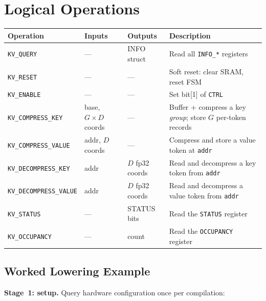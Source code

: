 \documentclass[11pt]{article}
\begin{document}
\section{Logical Operations}
\label{sec:ops}

\begin{table}[h]
\centering
\small
\begin{tabular}{@{}l l l p{5.5cm}@{}}
\toprule
Operation                     & Inputs             & Outputs          & Description \\
\midrule
\texttt{KV\_QUERY}            & ---                & INFO struct      & Read all \texttt{INFO\_*} registers \\
\texttt{KV\_RESET}            & ---                & ---              & Soft reset: clear SRAM, reset FSM \\
\texttt{KV\_ENABLE}           & ---                & ---              & Set bit[1] of \texttt{CTRL} \\
\texttt{KV\_COMPRESS\_KEY}    & base, $G{\times}D$ coords & ---       & Buffer + compress a key \emph{group}; store $G$ per-token records \\
\texttt{KV\_COMPRESS\_VALUE}  & addr, $D$ coords   & ---              & Compress and store a value token at \texttt{addr} \\
\texttt{KV\_DECOMPRESS\_KEY}  & addr               & $D$ fp32 coords  & Read and decompress a key token from \texttt{addr} \\
\texttt{KV\_DECOMPRESS\_VALUE}& addr               & $D$ fp32 coords  & Read and decompress a value token from \texttt{addr} \\
\texttt{KV\_STATUS}           & ---                & STATUS bits      & Read the \texttt{STATUS} register \\
\texttt{KV\_OCCUPANCY}        & ---                & count            & Read the \texttt{OCCUPANCY} register \\
\bottomrule
\end{tabular}
\end{table}

\subsection{Worked Lowering Example}
\label{sec:lowering}

\textbf{Stage~1: setup.} Query hardware configuration once per compilation:
\end{document}
